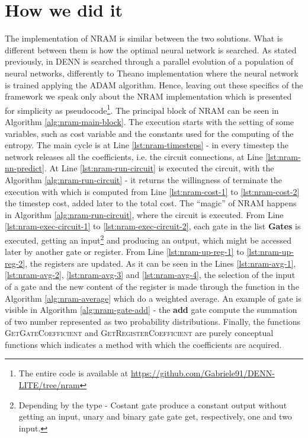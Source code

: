 \section{How we did it}
The implementation of NRAM is similar between the two solutions. What is different between them is how the optimal neural network is searched. As stated previously, in DENN is searched through a parallel evolution of a population of neural networks, differently to Theano implementation where the neural network is trained applying the ADAM algorithm. Hence, leaving out these specifics of the framework we speak only about the NRAM implementation which is presented for simplicity as pseudocode\footnote{The entire code is available at \href{https://github.com/Gabriele91/DENN-LITE/tree/nram}{https://github.com/Gabriele91/DENN-LITE/tree/nram}}.\newline
The principal block of NRAM can be seen in Algorithm \ref{alg:nram-main-block}. The execution starts with the setting of some variables, such as cost variable and the constants used for the computing of the entropy. The main cycle is at Line \ref{lst:nram-timesteps} - in every timestep the network releases all the coefficients, i.e. the circuit connections, at Line \ref{lst:nram-nn-predict}. At Line \ref{lst:nram-run-circuit} is executed the circuit, with the Algorithm \ref{alg:nram-run-circuit} - it returns the willingness of terminate the execution with which is computed from Line \ref{lst:nram-cost-1} to \ref{lst:nram-cost-2} the timestep cost, added later to the total cost. The ``magic'' of NRAM happens in Algorithm \ref{alg:nram-run-circuit}, where the circuit is executed. From Line \ref{lst:nram-exec-circuit-1} to \ref{lst:nram-exec-circuit-2}, each gate in the list \textbf{Gates} is executed, getting an input\footnote{Depending by the type - Costant gate produce a constant output without getting an input, unary and binary gate gate get, respectively, one and two input.} and producing an output, which might be accessed later by another gate or register. From Line \ref{lst:nram-up-reg-1} to \ref{lst:nram-up-reg-2}, the registers are updated.
\newline\newline
As it can be seen in the Lines \ref{lst:nram-avg-1}, \ref{lst:nram-avg-2}, \ref{lst:nram-avg-3} and \ref{lst:nram-avg-4}, the selection of the input of a gate and the new content of the register is made through the function in the Algorithm \ref{alg:nram-average} which do a weighted average. An example of gate is visible in Algorithm \ref{alg:nram-gate-add} - the \textbf{add} gate compute the summation of two number represented as two probability distributions. Finally, the functions \textsc{GetGateCoefficient} and \textsc{GetRegisterCoefficient} are purely conceptual functions which indicates a method with which the coefficients are acquired.
